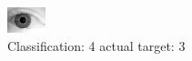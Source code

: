 \begin{figure}[h!]
\begin{center}
\includegraphics[width=0.60\columnwidth]{figures/ID2141_class_4_target_3.png}
\end{center}
\caption{ Classification: 4 actual target: 3}
\label{fig:ID2141_class_4_target_3}
\end{figure}
